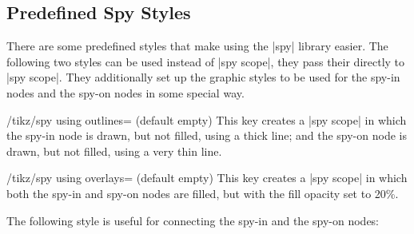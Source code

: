 \subsection{Predefined Spy Styles}

There are some predefined styles that make using the |spy| library
easier. The following two styles can be used instead of |spy scope|,
they pass their  directly to |spy scope|. They
additionally set up the graphic styles to be used for the spy-in nodes
and the spy-on nodes in some special way.

\begin{key}{/tikz/spy using outlines= (default
    \normalfont empty)}
  This key creates a |spy scope| in which the spy-in node is drawn,
  but not filled, using a thick line; and the spy-on node is drawn,
  but not filled, using a very thin line.

\begin{codeexample}[]
\end{codeexample}
\end{key}

\begin{key}{/tikz/spy using overlays= (default
    \normalfont empty)}
  This key creates a |spy scope| in which both the spy-in and spy-on
  nodes are filled, but with the fill opacity set to 20\%.

\begin{codeexample}[]
\end{codeexample}
\end{key}

The following style is useful for connecting the spy-in and the spy-on
nodes:

